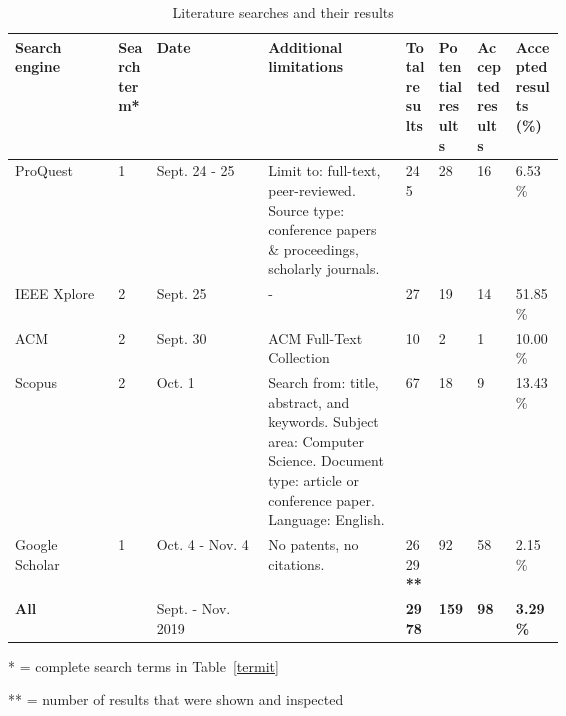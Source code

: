 \documentclass[utf8,english]{gradu3}
\begin{document}
\clearpage
\begin{landscape}
  \begin{table}[p]
    \caption{Literature searches and their results}
    \label{table}
    \begin{tabular}{|l|p{0.075\linewidth}|l|p{0.25\linewidth}|p{0.065\linewidth}|p{0.075\linewidth}|p{0.075\linewidth}|p{0.095\linewidth}|}
      \hline
      \textbf{Search engine} & \textbf{Search term*} & \textbf{Date}     & \textbf{Additional limitations}                                                                                                            & \textbf{Total results} & \textbf{Potential results} & \textbf{Accepted results} & \textbf{Accepted results (\%)} \\ \hline
      ProQuest               & 1                     & Sept. 24 - 25     & Limit to: full-text, peer-reviewed. Source type: conference papers \& proceedings, scholarly journals.                                     & 245                    & 28                         & 16                        & 6.53\%                         \\ \hline
      IEEE Xplore            & 2                     & Sept. 25          & -                                                                                                                                          & 27                     & 19                         & 14                        & 51.85\%                        \\ \hline
      ACM                    & 2                     & Sept. 30          & ACM Full-Text Collection                                                                                                                   & 10                     & 2                          & 1                         & 10.00\%                        \\ \hline
      Scopus                 & 2                     & Oct. 1            & Search from: title, abstract, and keywords. Subject area: Computer Science. Document type: article or conference paper. Language: English. & 67                     & 18                         & 9                         & 13.43\%                        \\ \hline
      Google Scholar         & 1                     & Oct. 4 - Nov. 4   & No patents, no citations.                                                                                                                  & 2629\textbf{**}        & 92                         & 58                        & 2.15\%                         \\ \hline
      \textbf{All}           &                       & Sept. - Nov. 2019 &                                                                                                                                            & \textbf{2978}          & \textbf{159}               & \textbf{98}               & \textbf{3.29\%}                \\ \hline
    \end{tabular}
    * = complete search terms in Table~\ref{termit}

    ** = number of results that were shown and inspected
  \end{table}
\end{landscape}
\end{document}
